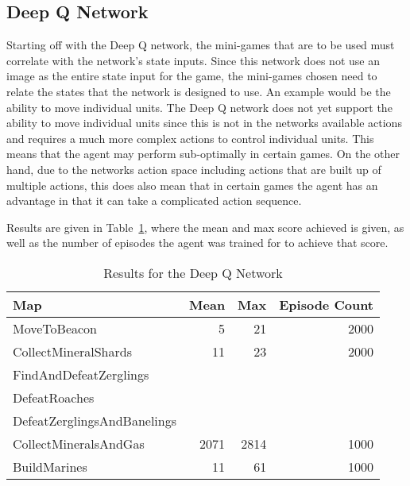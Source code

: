 \subsection{Deep Q Network}

Starting off with the Deep Q network, the mini-games that are to be used must
correlate with the network's state inputs. Since this network does not use an
image as the entire state input for the game, the mini-games chosen need to
relate the states that the network is designed to use. An example would be the
ability to move individual units. The Deep Q network does not yet support the
ability to move individual units since this is not in the networks available actions and
requires a much more complex actions to control individual units. This means
that the agent may perform sub-optimally in certain games.
On the other hand, due to the networks action space including actions that are
built up of multiple actions, this does also mean that in certain games the
agent has an advantage in that it can take a complicated action sequence.

Results are given in Table~\ref{tab:dqn_results}, where the mean and max score
achieved is given, as well as the number of episodes the agent was trained for
to achieve that score.

\begin{table}[h]
    \centering
    \begin{tabular}{@{}lrrr@{}}
        \toprule
        Map                         & Mean & Max & Episode Count \\ \midrule
        MoveToBeacon                & 5    & 21  & 2000          \\
        CollectMineralShards        & 11   & 23  & 2000          \\
        FindAndDefeatZerglings      &      &     &               \\
        DefeatRoaches               &      &     &               \\
        DefeatZerglingsAndBanelings &      &     &               \\
        CollectMineralsAndGas       & 2071 & 2814& 1000          \\
        BuildMarines                & 11   & 61  & 1000          \\ \bottomrule
    \end{tabular}
    \caption{Results for the Deep Q Network}%
    \label{tab:dqn_results}%
\end{table}

